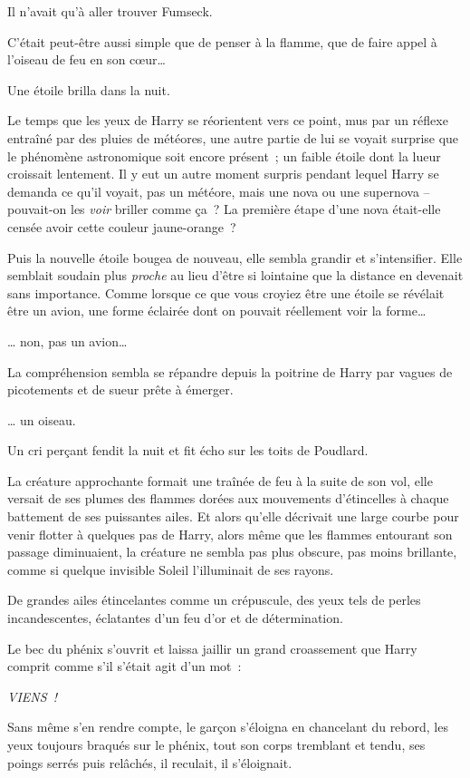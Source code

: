 Il n'avait qu'à aller trouver Fumseck.

C'était peut-être aussi simple que de penser à la flamme, que de faire appel à l'oiseau de feu en son cœur…

Une étoile brilla dans la nuit.

Le temps que les yeux de Harry se réorientent vers ce point, mus par un réflexe entraîné par des pluies de météores, une autre partie de lui se voyait surprise que le phénomène astronomique soit encore présent~; un faible étoile dont la lueur croissait lentement. Il y eut un autre moment surpris pendant lequel Harry se demanda ce qu'il voyait, pas un météore, mais une nova ou une supernova -- pouvait-on les \emph{voir} briller comme ça~? La première étape d'une nova était-elle censée avoir cette couleur jaune-orange~?

Puis la nouvelle étoile bougea de nouveau, elle sembla grandir et s'intensifier. Elle semblait soudain plus \emph{proche} au lieu d'être si lointaine que la distance en devenait sans importance. Comme lorsque ce que vous croyiez être une étoile se révélait être un avion, une forme éclairée dont on pouvait réellement voir la forme…

… non, pas un avion…

La compréhension sembla se répandre depuis la poitrine de Harry par vagues de picotements et de sueur prête à émerger.

… un oiseau.

Un cri perçant fendit la nuit et fit écho sur les toits de Poudlard.

La créature approchante formait une traînée de feu à la suite de son vol, elle versait de ses plumes des flammes dorées aux mouvements d'étincelles à chaque battement de ses puissantes ailes. Et alors qu'elle décrivait une large courbe pour venir flotter à quelques pas de Harry, alors même que les flammes entourant son passage diminuaient, la créature ne sembla pas plus obscure, pas moins brillante, comme si quelque invisible Soleil l'illuminait de ses rayons.

De grandes ailes étincelantes comme un crépuscule, des yeux tels de perles incandescentes, éclatantes d'un feu d'or et de détermination.

Le bec du phénix s'ouvrit et laissa jaillir un grand croassement que Harry comprit comme s'il s'était agit d'un mot~:

\emph{VIENS~!}

Sans même s'en rendre compte, le garçon s'éloigna en chancelant du rebord, les yeux toujours braqués sur le phénix, tout son corps tremblant et tendu, ses poings serrés puis relâchés, il reculait, il s'éloignait.

